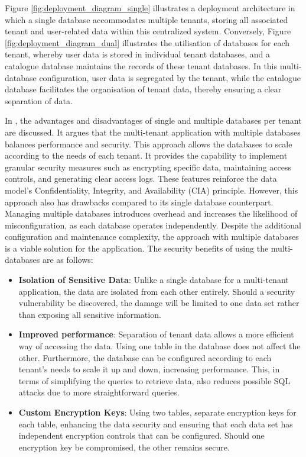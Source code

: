 Figure \ref{fig:deployment_diagram_single} illustrates a deployment architecture in which a single database accommodates multiple tenants, storing all associated tenant and user-related data within this centralized system. Conversely, Figure \ref{fig:deployment_diagram_dual} illustrates the utilisation of databases for each tenant, whereby user data is stored in individual tenant databases, and a catalogue database maintains the records of these tenant databases. In this multi-database configuration, user data is segregated by the tenant, while the catalogue database facilitates the organisation of tenant data, thereby ensuring a clear separation of data.



In \cite{niemela2023implementing}, the advantages and disadvantages of single and multiple databases per tenant are discussed. It argues that the multi-tenant application with multiple databases balances performance and security. This approach allows the databases to scale according to the needs of each tenant. It provides the capability to implement granular security measures such as encrypting specific data, maintaining access controls, and generating clear access logs. These features reinforce the data model's Confidentiality, Integrity, and Availability (CIA) principle. However, this approach also has drawbacks compared to its single database counterpart. Managing multiple databases introduces overhead and increases the likelihood of misconfiguration, as each database operates independently. Despite the additional configuration and maintenance complexity, the approach with multiple databases is a viable solution for the application. The security benefits of using the multi-databases are as follows:

\begin{itemize}
    \item \textbf{Isolation of Sensitive Data}: Unlike a single database for a multi-tenant application, the data are isolated from each other entirely. Should a security vulnerability be discovered, the damage will be limited to one data set rather than exposing all sensitive information. 
    
    \item \textbf{Improved performance}: Separation of tenant data allows a more efficient way of accessing the data. Using one table in the database does not affect the other. Furthermore, the database can be configured according to each tenant's needs to scale it up and down, increasing performance. This, in terms of simplifying the queries to retrieve data, also reduces possible SQL attacks due to more straightforward queries.
    
    \item \textbf{Custom Encryption Keys}: Using two tables, separate encryption keys for each table, enhancing the data security and ensuring that each data set has independent encryption controls that can be configured. Should one encryption key be compromised, the other remains secure. 
 
\end{itemize}

